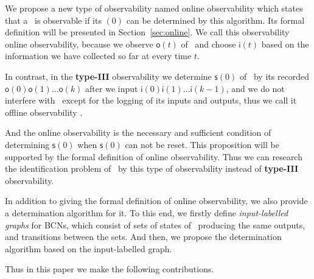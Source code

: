 

We propose a new type of observability named online observability which states that a \BCN\ is observable if its \State$(0)$ can be determined by this algorithm. Its formal definition will be presented in Section~\ref{sec:online}.  We call this observability online observability, because we observe $\mathsf{o}(t)$ of \BCN\ and choose $\mathsf{i}(t)$ based on the information we have collected so far at every time $t$. 

In contrast, in the {\bf type-III} observability we determine $\mathsf{s}(0)$ of \BCN\ by its recorded $\mathsf{o}(0)\mathsf{o}(1)\ldots\mathsf{o}(k)$ after we input $\mathsf{i}(0)\mathsf{i}(1)\ldots\mathsf{i}(k-1)$, and  we do not interfere with \BCN\ except for the logging of its inputs and outputs, thus we call it offline observability \cite{Cassar2017A}.
 
  And the online observability is the necessary and sufficient condition of determining $\mathsf{s}(0)$ when $\mathsf{s}(0)$ can not be reset. This proposition will be supported by the formal definition of  online observability.  Thus we can research the identification problem of \BCNs\ by this type of observability instead of {\bf type-III} observability.




In addition to giving the formal definition of online observability, we also provide a determination algorithm for it. To this end, we firstly define {\em input-labelled graphs} for BCNs, which consist of sets of states of \BCNs\ producing the same outputs, and transitions between the sets. And then, we propose the determination algorithm based on the input-labelled graph.

Thus in this paper we make the following contributions.

